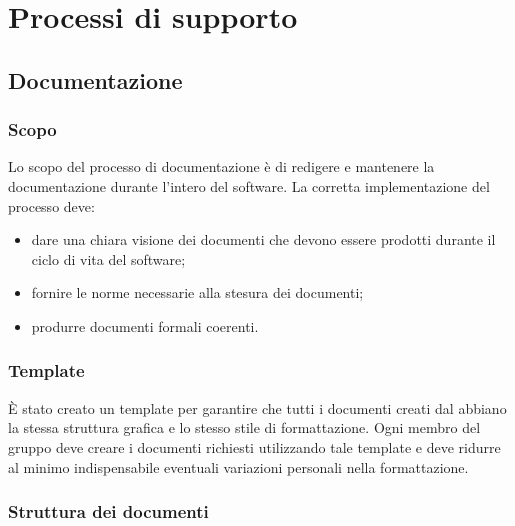 \section{Processi di supporto}
    \subsection{Documentazione}
        \subsubsection{Scopo}
        Lo scopo del processo di documentazione è di redigere e mantenere la documentazione durante l'intero  del software. La corretta implementazione del processo deve:
        \begin{itemize}
            \item dare una chiara visione dei documenti che devono essere prodotti durante il ciclo di vita del software;
            \item fornire le norme necessarie alla stesura dei documenti;
            \item produrre documenti formali coerenti.
        \end{itemize}
        \subsubsection{Template}
        È stato creato un template  per garantire che tutti i documenti creati dal  abbiano la stessa struttura grafica e lo stesso stile di formattazione. Ogni membro del gruppo deve creare i documenti richiesti utilizzando tale template e deve ridurre al minimo indispensabile eventuali variazioni personali nella formattazione.
        \subsubsection{Struttura dei documenti} \label{sec:strutturaDoc}

